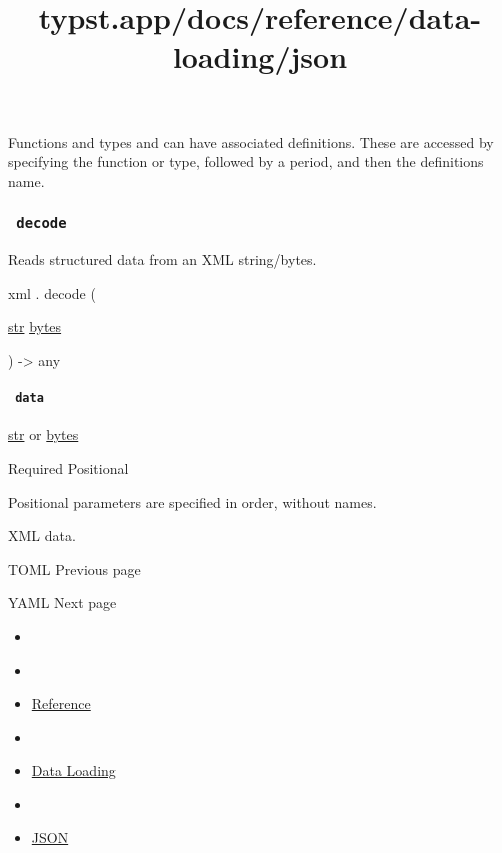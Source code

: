 \label{definitions-tooltip}
Functions and types and can have associated definitions. These are
accessed by specifying the function or type, followed by a period, and
then the definition\textquotesingle s name.

\subsubsection{\texorpdfstring{\texttt{\ decode\ }}{ decode }}\label{definitions-decode}

Reads structured data from an XML string/bytes.

xml { . } { decode } (

{ \href{/docs/reference/foundations/str/}{str}
\href{/docs/reference/foundations/bytes/}{bytes} }

) -\textgreater{} { any }

\paragraph{\texorpdfstring{\texttt{\ data\ }}{ data }}\label{definitions-decode-data}

\href{/docs/reference/foundations/str/}{str} {or}
\href{/docs/reference/foundations/bytes/}{bytes}

{Required} {{ Positional }}

\label{definitions-decode-data-positional-tooltip}
Positional parameters are specified in order, without names.

XML data.

\href{/docs/reference/data-loading/toml/}{\pandocbounded{}}

{ TOML } { Previous page }

\href{/docs/reference/data-loading/yaml/}{\pandocbounded{}}

{ YAML } { Next page }


\title{typst.app/docs/reference/data-loading/json}

\begin{itemize}
\tightlist
\item
  \href{/docs}{}
\item
  
\item
  \href{/docs/reference/}{Reference}
\item
  
\item
  \href{/docs/reference/data-loading/}{Data Loading}
\item
  
\item
  \href{/docs/reference/data-loading/json/}{JSON}
\end{itemize}

